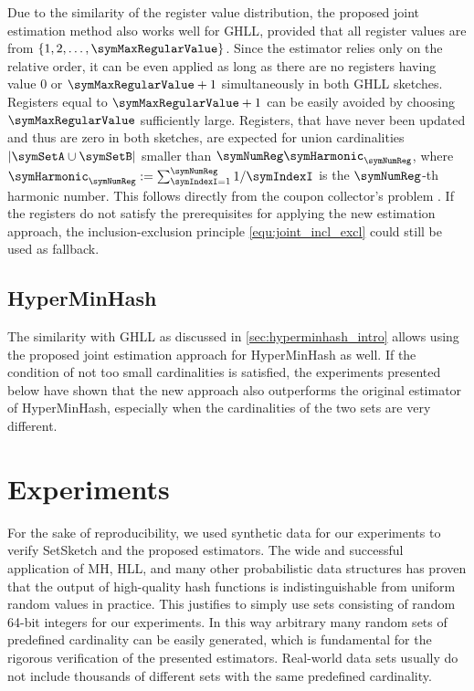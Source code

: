 \documentclass[sigconf, nonacm]{acmart}
\begin{document}
Due to the similarity of the register value distribution, the proposed joint estimation method also works well for \ac{GHLL}, provided that all register values are from $\lbrace 1,2,\ldots,\symMaxRegularValue\rbrace$. Since the estimator relies only on the relative order, it can be even applied as long as there are no registers having value 0 or $\symMaxRegularValue+1$ simultaneously in both \ac{GHLL} sketches. Registers equal to $\symMaxRegularValue+1$ can be easily avoided by choosing $\symMaxRegularValue$ sufficiently large. Registers, that have never been updated and thus are zero in both sketches, are expected for union cardinalities $|\symSetA\cup\symSetB|$ smaller than $\symNumReg \symHarmonic_\symNumReg$, where $\symHarmonic_\symNumReg:=\sum_{\symIndexI=1}^\symNumReg 1/\symIndexI$ is the $\symNumReg$-th harmonic number. This follows directly from the coupon collector's problem \cite{Mitzenmacher2005}. If the registers do not satisfy the prerequisites for applying the new estimation approach, the inclusion-exclusion principle \eqref{equ:joint_incl_excl} could still be used as fallback. 

\subsection{HyperMinHash}
The similarity with \ac{GHLL} as discussed in \cref{sec:hyperminhash_intro} allows using the proposed joint estimation approach for HyperMinHash as well. If the condition of not too small cardinalities is satisfied, the experiments presented below have shown that the new approach also outperforms the original estimator of HyperMinHash, especially when the cardinalities of the two sets are very different.

\section{Experiments}

For the sake of reproducibility, we used synthetic data for our experiments to verify SetSketch and the proposed estimators. 
The wide and successful application of \ac{MH}, \ac{HLL}, and many other probabilistic data structures has proven that the output of high-quality hash functions \cite{Urban2020} is indistinguishable from uniform random values in practice. This justifies to simply use sets consisting of random 64-bit integers for our experiments. In this way arbitrary many random sets of predefined cardinality can be easily generated, which is fundamental for the rigorous verification of the presented estimators. Real-world data sets usually do not include thousands of different sets with the same predefined cardinality.
\end{document}
